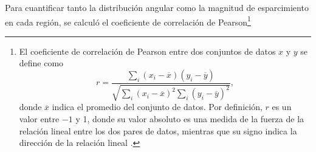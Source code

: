 Para cuantificar tanto la distribución angular como la magnitud de esparcimiento en cada región, se calculó el coeficiente de correlación de Pearson\footnote{
	El coeficiente de correlación de Pearson entre dos conjuntos de datos $x$ y $y$ se define como \cite{rossIntroductionProbabilityStatistics2014}
	$$r=\dfrac{\sum_{i}{(x_i-\overline{x})(y_i-\overline{y})}}{\sqrt{\sum_{i}{(x_i-\overline{x})^2} \sum_{i}{(y_i-\overline{y})^2}}},$$
	donde $\overline{x}$ indica el promedio del conjunto de datos. Por definición, $r$ es un valor entre $-1$ y 1, donde su valor absoluto es una medida de la fuerza de la relación lineal entre los dos pares de datos, mientras que su signo indica la dirección de la relación lineal \cite{rossIntroductionProbabilityStatistics2014}.} %

